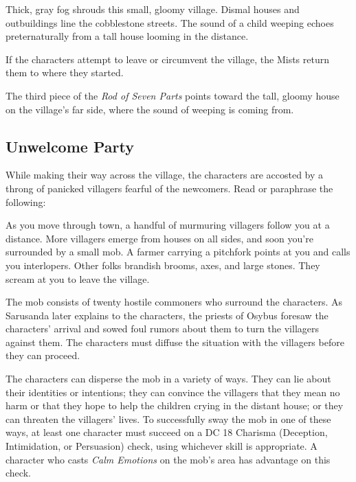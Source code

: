 \documentclass[10pt,a4paper,twoside,bg=print,twocolumn,openany,nodeprecatedcode]{dndbook}
\begin{document}
\begin{DndReadAloud}{}
Thick, gray fog shrouds this small, gloomy village. Dismal houses and outbuildings line the cobblestone streets. The sound of a child weeping echoes preternaturally from a tall house looming in the distance.

\end{DndReadAloud}

If the characters attempt to leave or circumvent the village, the Mists return them to where they started.

The third piece of the \textit{Rod of Seven Parts} points toward the tall, gloomy house on the village's far side, where the sound of weeping is coming from.

\subsection{Unwelcome Party}
While making their way across the village, the characters are accosted by a throng of panicked villagers fearful of the newcomers. Read or paraphrase the following:

\begin{DndReadAloud}{}
As you move through town, a handful of murmuring villagers follow you at a distance. More villagers emerge from houses on all sides, and soon you're surrounded by a small mob. A farmer carrying a pitchfork points at you and calls you interlopers. Other folks brandish brooms, axes, and large stones. They scream at you to leave the village.

\end{DndReadAloud}

The mob consists of twenty hostile commoners who surround the characters. As Sarusanda later explains to the characters, the priests of Osybus foresaw the characters' arrival and sowed foul rumors about them to turn the villagers against them. The characters must diffuse the situation with the villagers before they can proceed.

The characters can disperse the mob in a variety of ways. They can lie about their identities or intentions; they can convince the villagers that they mean no harm or that they hope to help the children crying in the distant house; or they can threaten the villagers' lives. To successfully sway the mob in one of these ways, at least one character must succeed on a DC 18 Charisma (Deception, Intimidation, or Persuasion) check, using whichever skill is appropriate. A character who casts \textit{Calm Emotions} on the mob's area has advantage on this check.
\end{document}
